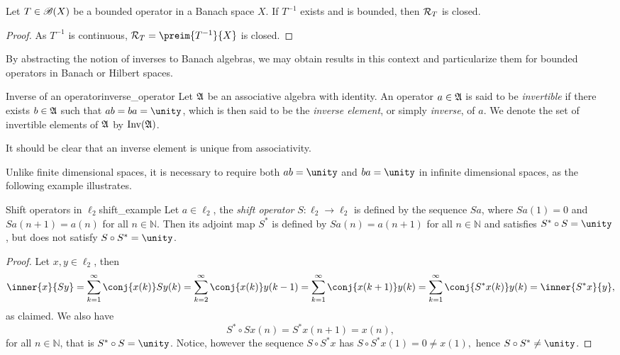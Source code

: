 \begin{corollary}
    Let \(T\in \mathscr{B}(X)\) be a bounded operator in a Banach space \(X\). If \(T^{-1}\) exists and is bounded, then \(\mathcal{R}_{T}\) is closed.
\end{corollary}
\begin{proof}
    As \(T^{-1}\) is continuous, \(\range{T} = \preim{T^{-1}}{X}\) is closed.
\end{proof}

By abstracting the notion of inverses to Banach algebras, we may obtain results in this context and particularize them for bounded operators in Banach or Hilbert spaces.
\begin{definition}{Inverse of an operator}{inverse_operator}
    Let \(\mathfrak{A}\) be an associative algebra with identity. An operator \(a \in \mathfrak{A}\) is said to be \emph{invertible} if there exists \(b \in \mathfrak{A}\) such that \(ab = ba = \unity\), which is then said to be the \emph{inverse element}, or simply \emph{inverse}, of \(a\). We denote the set of invertible elements of \(\mathfrak{A}\) by \(\operatorname{Inv}(\mathfrak{A})\).
\end{definition}
\begin{remark}
    It should be clear that an inverse element is unique from associativity.
\end{remark}

Unlike finite dimensional spaces, it is necessary to require both \(ab = \unity\) and \(ba = \unity\) in infinite dimensional spaces, as the following example illustrates.
\begin{example}{Shift operators in \(\ell_2\)}{shift_example}
    Let \(a \in \ell_2\), the \emph{shift operator} \(S : \ell_2 \to \ell_2\) is defined by the sequence \(Sa\), where \(Sa(1) = 0\) and \(Sa(n+1) = a(n)\) for all \(n \in \mathbb{N}\). Then its adjoint map \(S^*\) is defined by \(Sa(n) = a(n+1)\) for all \(n \in \mathbb{N}\) and satisfies \(S^*\circ S = \unity\), but does not satisfy \(S \circ S^* = \unity\).
\end{example}
\begin{proof}
    Let \(x,y \in \ell_2\), then
    \begin{equation*}
        \inner{x}{Sy} = \sum_{k=1}^\infty \conj{x(k)} Sy(k) = \sum_{k=2}^\infty \conj{x(k)} y(k-1) = \sum_{k=1}^\infty \conj{x(k+1)}y(k) = \sum_{k=1}^\infty \conj{S^*x(k)}y(k) = \inner{S^*x}{y},
    \end{equation*}
    as claimed. We also have
    \begin{equation*}
        S^* \circ Sx(n) = S^*x(n+1) = x(n),
    \end{equation*}
    for all \(n \in \mathbb{N}\), that is \(S^* \circ S = \unity\). Notice, however the sequence \(S \circ S^* x\) has \(S\circ S^* x(1) = 0 \neq x(1),\) hence \(S \circ S^* \neq \unity\).
\end{proof}


